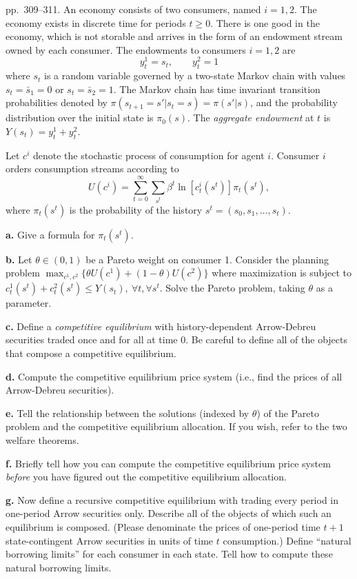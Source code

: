 \documentclass[12pt, letterpaper]{article}
\begin{document}
\begin{tcolorbox}[oddbox,title={Exercise 8.7 \quad Two consumers, Markov endowment}]
\begin{tcolorbox}[questionbox]
pp.~309--311. An economy consists of two consumers, named $i=1,2$. The economy exists in discrete time for
periods $t\ge0$. There is one good in the economy, which is not storable and arrives in the form of an
endowment stream owned by each consumer. The endowments to consumers $i=1,2$ are
\[
y^1_t=s_t,\qquad y^2_t=1
\]
where $s_t$ is a random variable governed by a two-state Markov chain with values $s_t=\bar s_1=0$ or
$s_t=\bar s_2=1$. The Markov chain has time invariant transition probabilities denoted by
$\pi(s_{t+1}=s'|s_t=s)=\pi(s'|s)$, and the probability distribution over the initial state is $\pi_0(s)$. The
\emph{aggregate endowment} at $t$ is $Y(s_t)=y^1_t+y^2_t$.

Let $c^i$ denote the stochastic process of consumption for agent $i$. Consumer $i$ orders consumption
streams according to
\[
U(c^i)=\sum_{t=0}^\infty\sum_{s^t}\beta^t\ln[c^i_t(s^t)]\pi_t(s^t),
\]
where $\pi_t(s^t)$ is the probability of the history $s^t=(s_0,s_1,\dots,s_t)$.

\textbf{a.} Give a formula for $\pi_t(s^t)$.

\textbf{b.} Let $\theta\in(0,1)$ be a Pareto weight on consumer 1. Consider the planning problem
$\max_{c^1,c^2}\{\theta U(c^1)+(1-\theta)U(c^2)\}$ where maximization is subject to
$c^1_t(s^t)+c^2_t(s^t)\le Y(s_t),\ \forall t,\forall s^t$. Solve the Pareto problem, taking $\theta$ as a parameter.

\textbf{c.} Define a \emph{competitive equilibrium} with history-dependent Arrow-Debreu securities traded
once and for all at time 0. Be careful to define all of the objects that compose a competitive equilibrium.

\textbf{d.} Compute the competitive equilibrium price system (i.e., find the prices of all Arrow-Debreu
securities).

\textbf{e.} Tell the relationship between the solutions (indexed by $\theta$) of the Pareto problem and the
competitive equilibrium allocation. If you wish, refer to the two welfare theorems.

\textbf{f.} Briefly tell how you can compute the competitive equilibrium price system \emph{before} you have
figured out the competitive equilibrium allocation.

\textbf{g.} Now define a recursive competitive equilibrium with trading every period in one-period Arrow
securities only. Describe all of the objects of which such an equilibrium is composed. (Please denominate
the prices of one-period time $t+1$ state-contingent Arrow securities in units of time $t$ consumption.)
Define ``natural borrowing limits'' for each consumer in each state. Tell how to compute these natural
borrowing limits.


\end{tcolorbox}
\end{tcolorbox}
\end{document}
